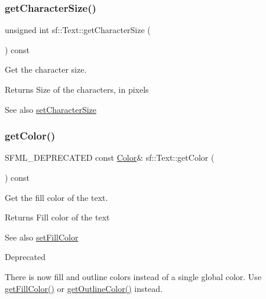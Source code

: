 \subsubsection{\texorpdfstring{getCharacterSize()}{getCharacterSize()}}
{\footnotesize\ttfamily unsigned int sf\+::\+Text\+::get\+Character\+Size (\begin{DoxyParamCaption}{ }\end{DoxyParamCaption}) const}



Get the character size. 

\begin{DoxyReturn}{Returns}
Size of the characters, in pixels
\end{DoxyReturn}
\begin{DoxySeeAlso}{See also}
\mbox{\hyperlink{classsf_1_1_text_ae96f835fc1bff858f8a23c5b01eaaf7e}{set\+Character\+Size}} \begin{DoxyVerb}\end{DoxyVerb}
 
\end{DoxySeeAlso}
\mbox{\label{classsf_1_1_text_a77ba664285efd72ab4ce85b9cbbeeb21}} 
\subsubsection{\texorpdfstring{getColor()}{getColor()}}
{\footnotesize\ttfamily S\+F\+M\+L\+\_\+\+D\+E\+P\+R\+E\+C\+A\+T\+ED const \mbox{\hyperlink{classsf_1_1_color}{Color}}\& sf\+::\+Text\+::get\+Color (\begin{DoxyParamCaption}{ }\end{DoxyParamCaption}) const}



Get the fill color of the text. 

\begin{DoxyReturn}{Returns}
Fill color of the text
\end{DoxyReturn}
\begin{DoxySeeAlso}{See also}
\mbox{\hyperlink{classsf_1_1_text_ab7bb3babac5a6da1802b2c3e1a3e6dcc}{set\+Fill\+Color}}
\end{DoxySeeAlso}
\begin{DoxyRefDesc}{Deprecated}
\item[\mbox{\hyperlink{deprecated__deprecated000017}{Deprecated}}]There is now fill and outline colors instead of a single global color. Use \mbox{\hyperlink{classsf_1_1_text_a6b4ba8c435b59e1e05f831e6230dc537}{get\+Fill\+Color()}} or \mbox{\hyperlink{classsf_1_1_text_a53559d563461089f1172571b375442dc}{get\+Outline\+Color()}} instead. \end{DoxyRefDesc}
\begin{DoxyVerb}\end{DoxyVerb}
 \mbox{\label{classsf_1_1_text_a6b4ba8c435b59e1e05f831e6230dc537}} 
